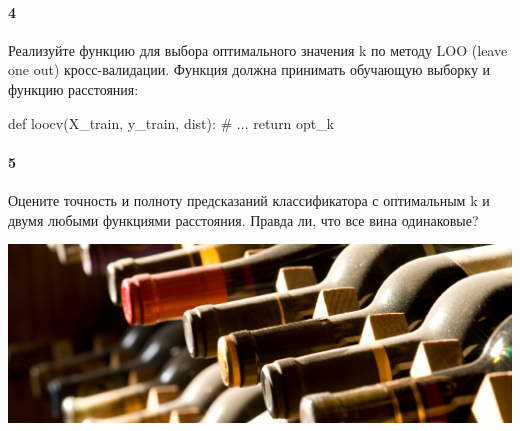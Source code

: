 \documentclass[a4paper,12pt]{article}
\begin{document}
\paragraph{4} Реализуйте функцию для выбора оптимального значения k по методу
LOO (leave one out) кросс-валидации. Функция должна принимать обучающую выборку
и функцию расстояния:
\begin{python3}
  def loocv(X_train, y_train, dist):
      # ...
      return opt_k
\end{python3}


\paragraph{5} Оцените точность и полноту предсказаний классификатора с
оптимальным k и двумя любыми функциями расстояния. Правда ли, что все вина
одинаковые?

\bigbreak
\begin{center}
\includegraphics[width=\textwidth, keepaspectratio]{images/wine}
\end{center}
\end{document}
